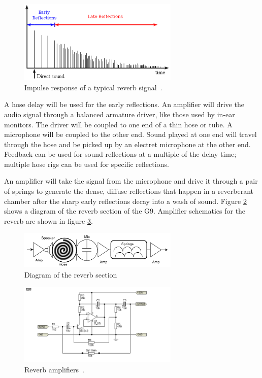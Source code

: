 \documentclass[journal]{IEEEtran}
\begin{document}
	\begin{figure}
		\centering
		\includegraphics[width=3in]{earlyReflections}
		\caption{Impulse response of a typical reverb signal~\cite{vocalEarlyReflections}. }
		\label{fig:earlyReflections}
	\end{figure}
	
	A hose delay will be used for the early reflections. An amplifier will drive the audio signal through a balanced armature driver, like those used by in-ear monitors. The driver will be coupled to one end of a thin hose or tube. A microphone will be coupled to the other end. Sound played at one end will travel through the hose and be picked up by an electret microphone at the other end. Feedback can be used for sound reflections at a multiple of the delay time; multiple hose rigs can be used for specific reflections.
	
	An amplifier will take the signal from the microphone and drive it through a pair of springs to generate the dense, diffuse reflections that happen in a reverberant chamber after the sharp early reflections decay into a wash of sound. Figure \ref{fig:reverbBlock} shows a diagram of the reverb section of the G9. Amplifier schematics for the reverb are shown in figure \ref{fig:espMicPreSpringDrive}.
	
	\begin{figure}
		\centering
		\includegraphics[width=3in]{reverbBlock}
		\caption{Diagram of the reverb section }
		\label{fig:reverbBlock}
	\end{figure}
	
	
	
	\begin{figure}
		\centering
		\includegraphics[width=3in]{espMicPreSpringDrive}
		\caption{Reverb amplifiers~\cite{espMicPreSpringDrive}. }
		\label{fig:espMicPreSpringDrive}
	\end{figure}
\end{document}
